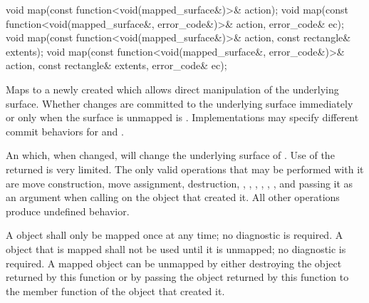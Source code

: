\begin{itemdecl}
void map(const function<void(mapped_surface&)>& action);
void map(const function<void(mapped_surface&, error_code&)>& action, error_code& ec);
void map(const function<void(mapped_surface&)>& action, const rectangle& extents);
void map(const function<void(mapped_surface&, error_code&)>& action,
  const rectangle& extents, error_code& ec);
\end{itemdecl}
\begin{itemdescr}
	\pnum
	\effects
	Maps  to a newly created  which allows direct manipulation of the underlying surface. Whether changes are committed to the underlying surface immediately or only when the surface is unmapped is . Implementations may specify different commit behaviors for  and .
	
	\pnum
	\returns
	An  which, when changed, will change the underlying surface of .
	\enternote
	Use of the returned  is very limited. The only valid operations that may be performed with it are move construction, move assignment, destruction, , , , , , , and passing it as an argument when calling  on the  object that created it. All other operations produce undefined behavior.
	\exitnote
	
	\pnum
	\remarks
	A  object shall only be mapped once at any time; no diagnostic is required. A  object that is mapped shall not be used until it is unmapped; no diagnostic is required. A mapped  object can be unmapped by either destroying the  object returned by this function or by passing the  object returned by this function to the  member function of the  object that created it.
\end{itemdescr}

